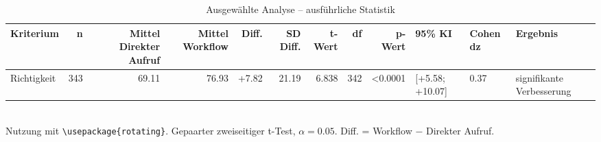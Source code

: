 \begin{table}
\centering
\caption{Ausgewählte Analyse -- ausführliche Statistik}
\begin{tabular}{lrrrrrrrrlll}
\toprule
Kriterium & n & Mittel Direkter Aufruf & Mittel Workflow & Diff. & SD Diff. & t-Wert & df & p-Wert & 95\% KI & Cohen dz & Ergebnis \\
\midrule
Richtigkeit & 343 & 69.11 & 76.93 & +7.82 & 21.19 & 6.838 & 342 & <0.0001 & [+5.58; +10.07] & 0.37 & signifikante Verbesserung \\
\bottomrule
\end{tabular}
\\[2mm]
\footnotesize Nutzung mit \texttt{\textbackslash usepackage\{rotating\}}. Gepaarter zweiseitiger t-Test, $\alpha=0.05$. Diff. = Workflow $-$ Direkter Aufruf.
\end{table}
